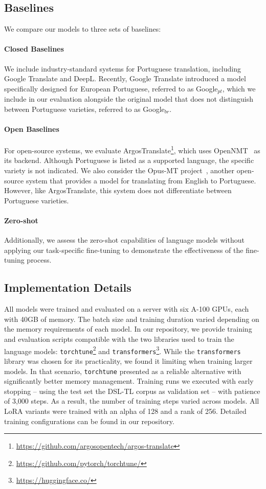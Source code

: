 \subsection{Baselines}
We compare our models to three sets of baselines:

\paragraph{Closed Baselines}
We include industry-standard systems for Portuguese translation, including Google Translate and DeepL. Recently, Google Translate introduced a model specifically designed for European Portuguese, referred to as Google$_{pt}$, which we include in our evaluation alongside the original model that does not distinguish between Portuguese varieties, referred to as Google$_{br}$.

\paragraph{Open Baselines}
For open-source systems, we evaluate ArgosTranslate\footnote{\url{https://github.com/argosopentech/argos-translate}}, which uses OpenNMT~\cite{Klein2017} as its backend. Although Portuguese is listed as a supported language, the specific variety is not indicated. We also consider the Opus-MT project~\cite{Tiedemann2020}, another open-source system that provides a model for translating from English to Portuguese. However, like ArgosTranslate, this system does not differentiate between Portuguese varieties.

\paragraph{Zero-shot}
Additionally, we assess the zero-shot capabilities of language models without applying our task-specific fine-tuning to demonstrate the effectiveness of the fine-tuning process.

\subsection{Implementation Details}

All models were trained and evaluated on a server with six A-100 GPUs, each with 40GB of memory. The batch size and training duration varied depending on the memory requirements of each model. In our repository, we provide training and evaluation scripts compatible with the two libraries used to train the language models: \texttt{torchtune}\footnote{\url{https://github.com/pytorch/torchtune/}} and \texttt{transformers}\footnote{\url{https://huggingface.co/}}. While the \texttt{transformers} library was chosen for its practicality, we found it limiting when training larger models. In that scenario, \texttt{torchtune} presented as a reliable alternative with significantly better memory management.
Training runs we executed with early stopping -- using the test set the DSL-TL corpus as validation set -- with patience of 3,000 steps. As a result, the number of training steps varied across models. All LoRA variants were trained with an alpha of 128 and a rank of 256. Detailed training configurations can be found in our repository.

